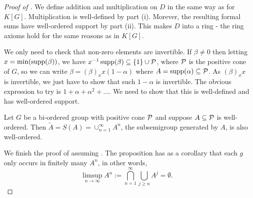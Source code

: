 \begin{proof}[Proof of ]
    We define addition and multiplication on $D$ in the same way as for $K[G]$.
    Multiplication is well-defined by  part (i).
    Morever, the resulting formal sums have well-ordered support by part (ii).
    This makes $D$ into a ring - the ring axioms hold for the same reasons as in $K[G]$.

    We only need to check that non-zero elements are invertible.
    If $\beta \neq 0$ then letting $x = \min(\operatorname{supp}(\beta))$, we have $x^{-1} \operatorname{supp}(\beta) \subseteq \{1\} \cup \mathcal{P}$, where $\mathcal{P}$ is the positive cone of $G$, so we can write $\beta = (\beta)_x x (1 - \alpha)$ where $A = \operatorname{supp}(\alpha) \subseteq \mathcal{P}$.
    As $(\beta)_x x$ is invertible, we just have to show that such $1 - \alpha$ is invertible.
    The obvious expression to try is $1 + \alpha + \alpha^2 + \dots$.
    We need to show that this is well-defined and has well-ordered support.

    \begin{proposition}
        \label{proposition:wellordered_subsemigroup}
        Let $G$ be a bi-ordered group with positive cone $\mathcal{P}$ and suppose $A \subseteq \mathcal{P}$ is well-ordered.
        Then $\tilde{A} = S(A) = \cup_{n=1}^\infty A^n$, the subsemigroup generated by $A$, is also well-ordered.
    \end{proposition}

    We finish the proof of  assuming .
    The proposition has as a corollary that each $g$ only occurs in finitely many $A^n$, in other words, \[
        \limsup_{n \to \infty} A^n := \bigcap_{n=1}^\infty \bigcup_{j \geq n} A^j = \emptyset.
    \]


\end{proof}
